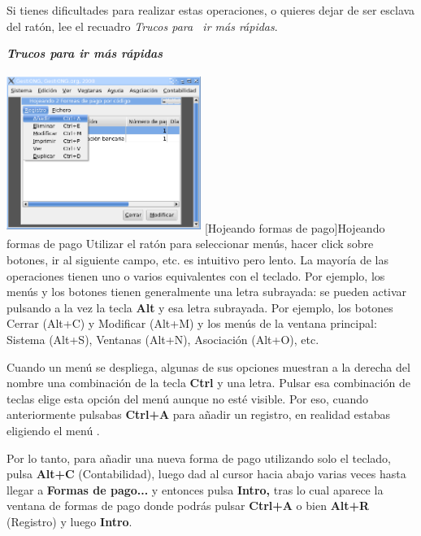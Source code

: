 Si tienes dificultades para realizar estas operaciones, o quieres dejar
de ser esclava del ratón, lee el recuadro
\textit{{\textquotesingle}Trucos para \ ir más
rápidas{\textquotesingle}}.



\begin{center}
\begin{minipage}{16.794cm}
{\centering\bfseries\itshape
Trucos para ir más rápidas
\par}

\includegraphics[width=6.332cm,height=5.186cm]{manual-img12.png}
[Hojeando formas de pago]{Hojeando formas de pago}
Utilizar el ratón para seleccionar menús, hacer click sobre botones,
ir al siguiente campo, etc. es intuitivo pero lento. La mayoría de
las operaciones tienen uno o varios equivalentes con el teclado. Por
ejemplo, los menús y los botones tienen generalmente una letra
subrayada: se pueden activar pulsando a la vez la tecla \textbf{Alt} y
esa letra subrayada. Por ejemplo, los botones Cerrar (Alt+C) y
Modificar (Alt+M) y los menús de la ventana principal: Sistema
(Alt+S), Ventanas (Alt+N), Asociación (Alt+O), etc.

Cuando un menú se despliega, algunas de sus opciones muestran a la
derecha del nombre una combinación de la tecla \textbf{Ctrl} y una
letra. Pulsar esa combinación de teclas elige esta opción del
menú aunque no esté visible. Por eso, cuando anteriormente pulsabas
\textbf{Ctrl+A} para añadir un registro, en realidad estabas
eligiendo el menú .

Por lo tanto, para añadir una nueva forma de pago utilizando solo el
teclado, pulsa \textbf{Alt+C} (Contabilidad), luego dad al cursor hacia
abajo varias veces hasta llegar a \textbf{Formas de pago...} y entonces
pulsa \textbf{Intro,} tras lo cual aparece la ventana de formas de pago
donde podrás pulsar \textbf{Ctrl+A} o bien \textbf{Alt+R} (Registro)
y luego \textbf{Intro}.
\end{minipage}
\end{center}


